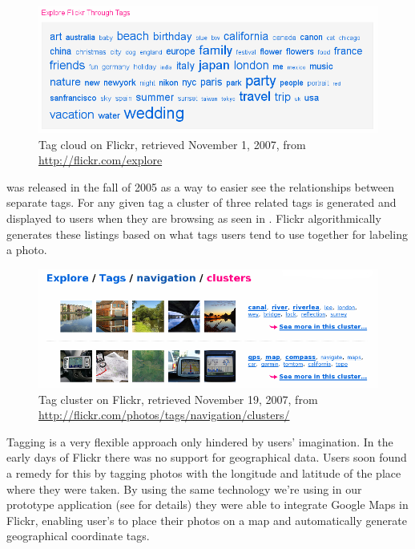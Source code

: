 \begin{figure}
  \begin{whole}
    \includegraphics[width=\wholewidth]{scrsh_flickr_tagcloud}
    \caption[Flickr Tag Cloud]{%
       Tag cloud on Flickr,
       retrieved November 1, 2007, from \url{http://flickr.com/explore}}
    \label{figure:scrsh.flickr.tagcloud}
  \end{whole}
\end{figure}

 was released in the fall of 2005 \citep{butterfield05}
as a way to easier see the relationships between separate tags. For any given
tag a cluster of three related tags is generated and displayed
 to users when
they are browsing as seen in .
Flickr algorithmically generates these listings based on what tags users tend
to use together for labeling a photo.

\begin{figure}
  \begin{whole}
    \includegraphics[width=\wholewidth]{scrsh_flickr_tagcluster}
    \caption[Flickr Tag Cluster]{%
       Tag cluster on Flickr,
       retrieved November 19, 2007, from
       \url{http://flickr.com/photos/tags/navigation/clusters/}}
    \label{figure:scrsh.flickr.tagcluster}
  \end{whole}
\end{figure}

Tagging is a very flexible approach only hindered by users' imagination. In
the early days of Flickr there was no support for geographical data. Users
soon found a remedy for this by tagging photos with the longitude and
latitude of the place where they were taken.
By using the same technology we're using in our prototype
application (see  for details)
they were able to integrate Google Maps%
 in Flickr, enabling user's to place their photos on a map and automatically
generate geographical coordinate tags.%


